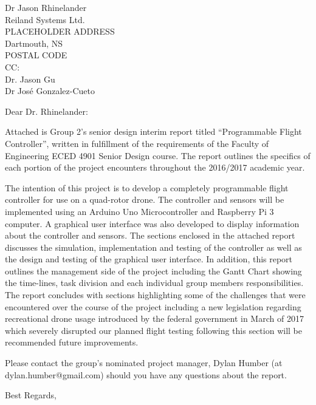 \documentclass[letterpaper]{letter}
\begin{document}
\begin{letter}{Dr Jason Rhinelander \\ Reiland Systems Ltd. \\ PLACEHOLDER ADDRESS \\ Dartmouth, NS \\ POSTAL CODE \\ CC: \\ Dr. Jason Gu \\ Dr Jos\'{e} Gonzalez-Cueto}	
\opening{Dear Dr. Rhinelander:}

Attached is Group 2’s senior design interim report titled “Programmable Flight Controller”, written in fulfillment of the requirements of the Faculty of Engineering ECED 4901 Senior Design course. The report outlines the specifics of each portion of the project encounters throughout the 2016/2017 academic year. 
	
The intention of this project is to develop a completely programmable flight controller for use on a quad-rotor drone. The controller and sensors will be implemented using an Arduino Uno Microcontroller and Raspberry Pi 3 computer. A graphical user interface was also developed to display information about the controller and sensors. The sections enclosed in the attached report discusses the simulation, implementation and testing of the controller as well as the design and testing of the graphical user interface. In addition, this report outlines the management side of the project including the Gantt Chart showing the time-lines, task division and each individual group members responsibilities. The report concludes with sections highlighting some of the challenges that were encountered over the course of the project including a new legislation regarding recreational drone usage introduced by the federal government in March of 2017 which severely disrupted our planned flight testing following this section will be recommended future improvements. 

Please contact the group’s nominated project manager, Dylan Humber (at  dylan.humber@gmail.com) should you have any questions about the report. 

\closing{Best Regards,}

\end{letter}
\end{document}
